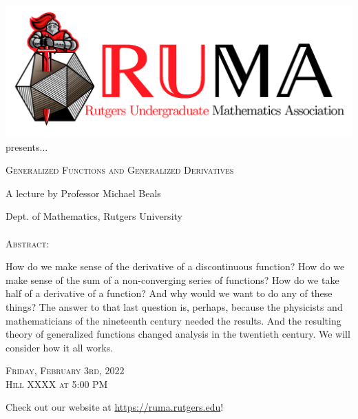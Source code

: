 \documentclass[12pt]{article}
\begin{document}

\begin{center}\includegraphics[scale=.2]{RUMAlogo.png}\\
\large  presents... \\

\vspace{1mm}
\begin{spacing}{2}
{\fontsize{28}{18}\selectfont  \textsc{
    Generalized Functions and Generalized Derivatives
    }} \end{spacing}
 
\begin{spacing}{1}
{\fontsize{18}{18} \selectfont A lecture by Professor Michael Beals}  \end{spacing} 
\large Dept. of Mathematics, Rutgers University \\~~\\

\normalsize
\textsc{Abstract:}

\LARGE
How do we make sense of the derivative of a discontinuous function?  How do we make sense of the sum of a non-converging series of functions?  How do we take half of a derivative of a function?  And why would we want to do any of these things?  The answer to that last question is, perhaps, because the physicists and mathematicians of the nineteenth century needed the results.  And the resulting theory of generalized functions changed analysis in the twentieth century.  We will consider how it all works.


\begin{spacing}{1.5}
    {\fontsize{24}{28}\selectfont  \textsc{
        Friday, February 3rd, 2022 \\ Hill XXXX at 5:00 PM}
    } 
\end{spacing}

\Large  Check out our website at 
\url{https://ruma.rutgers.edu}!
\end{center}
\end{document}
